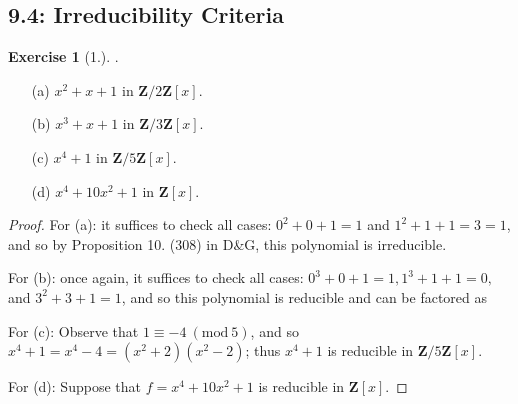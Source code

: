 \documentclass[9pt,reqno]{amsart}
\theoremstyle{definition}
\newtheorem{exercise}{Exercise}[section]
\newcommand{\zz}{\mathbf Z}
\newcommand{\Mod}[1]{\ (\mathrm{mod}\ #1)}
\begin{document}
\subsection{9.4: Irreducibility Criteria} 
\begin{exercise}[1.]. 

\begin{itemize}
	\item[(a)] $x^2 + x + 1$  in $\zz/ 2\zz  [x]$.
	\item[(b)] $x^3 + x + 1$  in $\zz/ 3\zz  [x]$.
	\item[(c)] $x^4 + 1$  in $\zz/ 5\zz  [x]$. 
	\item[(d)] $x^4 + 10x^2 + 1$ in $\zz[x]$.
\end{itemize}
\end{exercise}
\begin{proof}
	For (a): it suffices to check all cases: $0^2 + 0 + 1 = 1 $ and $1^2 + 1 + 1 = 3 =1$, and so by Proposition 10. (308) in D\&G, this polynomial is irreducible. 
	
	For (b): once again, it suffices to check all cases: $0^3 + 0 + 1 = 1, 1^3 + 1 + 1 = 0, $ and $3^2 + 3 + 1 = 1$, and so this polynomial is reducible and can be factored as 
	
	For (c): Observe that $1 \equiv -4  \Mod{5}$, and so $x^4  + 1 = x^4 - 4 = (x^2+2)(x^2 - 2)$; thus $x^4 + 1$ is reducible in $\zz / 5 \zz[x]$.
	
	For (d): Suppose that $f = x^4 + 10x^2 + 1$ is reducible in $\zz[x]$. 



\end{proof}
\end{document}
